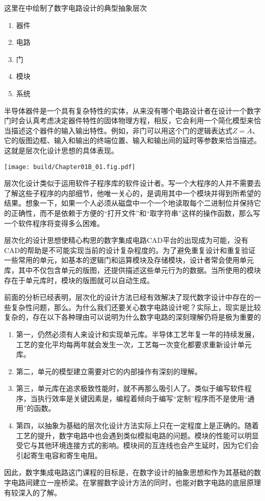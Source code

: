 这里在中绘制了数字电路设计的典型抽象层次
\begin{enumerate}
    \item 器件
    \item 电路
    \item 门
    \item 模块
    \item 系统
\end{enumerate}
半导体器件是一个具有复杂特性的实体，从来没有哪个电路设计者在设计一个数字门时会认真考虑决定器件特性的固体物理方程，相反，它会利用一个简化模型来恰当描述这个器件的输入输出特性。例如，非门可以用这个门的逻辑表达式$Z=\bar{A}$、它的版图边框、输入和输出的终端位置、输入和输出间的延时等参数来恰当描述。这就是层次化设计思想的具体表现。

\begin{Figure}[数字电路设计的抽象层次]
    \texttt{[image: build/Chapter01B\_01.fig.pdf]}
\end{Figure}

层次化设计类似于运用软件子程序库的软件设计者。写一个大程序的人并不需要去了解这些子程序的内部细节，他唯一关心的，是调用其中一个模块并得到所希望的结果。想象一下，如果一个人必须从磁盘中一个一个地读取每个二进制位并保持它的正确性，而不是依赖于方便的“打开文件”和“取字符串”这样的操作函数，那么写一个软件程序将变得多么困难。

层次化的设计思想使精心构思的数字集成电路CAD平台的出现成为可能，没有CAD的帮助是不可能实现当前的设计复杂程度的。为了避免重复设计和重复验证一些常用的单元，如基本的逻辑门和运算模块及存储模块，设计者常会使用单元库，其中不仅包含单元的版图，还提供描述这些单元行为的数据。当所使用的模块存在于单元库时，模块的版图就可以自动生成。

前面的分析已经表明，层次化的设计方法已经有效解决了现代数字设计中存在的一些复杂性问题，那么。为什么我们还要关心数字电路设计呢？实际上，现实是比较复杂的，存在以下各种理由可以说明为什么数字电路的深刻理解仍将是极为重要的
\begin{enumerate}
    \item 第一，仍然必须有人来设计和实现单元库。半导体工艺年复一年的持续发展，工艺的变化平均每两年就会发生一次，工艺每一次变化都要求重新设计单元库。
    \item 第二，单元的模型建立需要对它的内部操作有深刻的理解。
    \item 第三，单元库在追求极致性能时，就不再那么吸引人了。类似于编写软件程序，当执行效率是关键因素是，编程着倾向于编写“定制”程序而不是使用“通用”的函数。
    \item 第四，以抽象为基础的层次化设计方法实际上只在一定程度上是正确的。随着工艺的提升，数字电路中也会遇到类似模拟电路的问题。模块的性能可以明显受它与其他环境连接方式的影响。模块间的互连线也会产生延时，因为它们会引起寄生电容和寄生电阻。
\end{enumerate}

因此，数字集成电路这门课程的目标是，在数字设计的抽象思想和作为其基础的数字电路间建立一座桥梁。在掌握数字设计方法的同时，也能对数字电路的底层原理有较深入的了解。